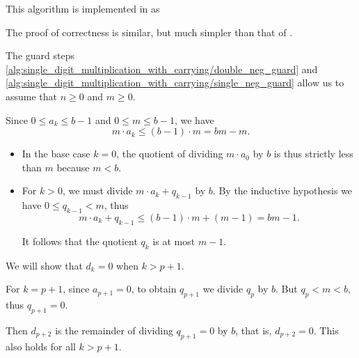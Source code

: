 \begin{comments}
  \item This algorithm is implemented in \cite{notebook:code} as
  \begin{CodeRefDisplay}
  \end{CodeRefDisplay}
\end{comments}
\begin{defproof}
  The proof of correctness is similar, but much simpler than that of .

  The guard steps \ref{alg:single_digit_multiplication_with_carrying/double_neg_guard} and \ref{alg:single_digit_multiplication_with_carrying/single_neg_guard} allow us to assume that \( n \geq 0 \) and \( m \geq 0 \).

   Since \( 0 \leq a_k \leq b - 1 \) and \( 0 \leq m \leq b - 1 \), we have
  \begin{equation*}
    m \cdot a_k \leq (b - 1) \cdot m = bm - m.
  \end{equation*}

  \begin{itemize}
    \item In the base case \( k = 0 \), the quotient of dividing \( m \cdot a_0 \) by \( b \) is thus strictly less than \( m \) because \( m < b \).

    \item For \( k > 0 \), we must divide \( m \cdot a_k + q_{k-1} \) by \( b \). By the inductive hypothesis we have \( 0 \leq q_{k-1} < m \), thus
    \begin{equation*}
      m \cdot a_k + q_{k-1} \leq (b - 1) \cdot m + (m - 1) = bm - 1.
    \end{equation*}

    It follows that the quotient \( q_k \) is at most \( m - 1 \).
  \end{itemize}

   We will show that \( d_k = 0 \) when \( k > p + 1 \).

  For \( k = p + 1 \), since \( a_{p + 1} = 0 \), to obtain \( q_{p + 1} \) we divide \( q_p \) by \( b \). But \( q_p < m < b \), thus \( q_{p + 1} = 0 \).

  Then \( d_{p + 2} \) is the remainder of dividing \( q_{p + 1} = 0 \) by \( b \), that is, \( d_{p + 2} = 0 \). This also holds for all \( k > p + 1 \).


\end{defproof}

